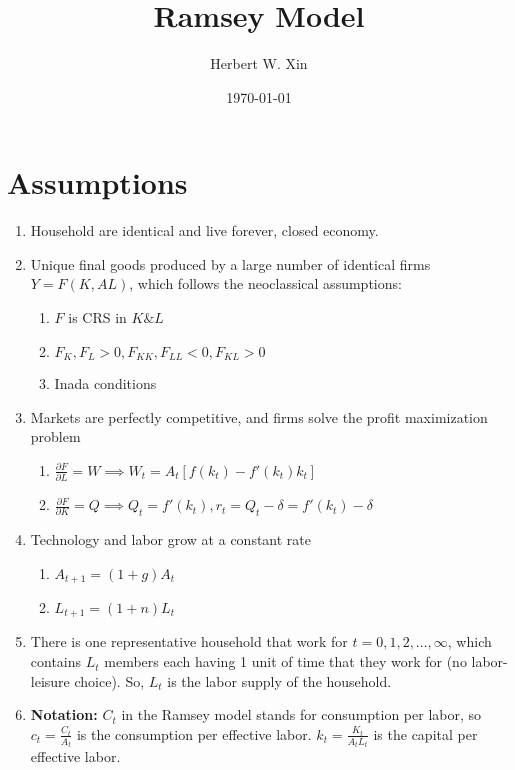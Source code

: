 \documentclass[twocolumn, fleqn]{article}
\begin{document}
	\title{Ramsey Model}
	\author{Herbert W. Xin}
	\date{\today}
	\maketitle

	\tableofcontents
	\thispagestyle{fancy}

	\section{Assumptions}\label{sec:assumptions}
		\begin{enumerate}
			\item Household are identical and live forever, closed economy.
			\item Unique final goods produced by a large number of identical firms $Y = F(K,AL)$, which follows the
			neoclassical assumptions:
				\begin{enumerate}
					\item $F$ is CRS in $K \& L$
					\item $F_K, F_L>0, F_{KK}, F_{LL}<0, F_{KL}>0$
					\item Inada conditions
				\end{enumerate}
			\item Markets are perfectly competitive, and firms solve the profit maximization problem
				\begin{enumerate}
					\item $\frac{\partial F}{\partial L}=W \implies W_t = A_t [f(k_t)-f'(k_t)k_t]$
					\item $\frac{\partial F}{\partial K}=Q \implies Q_t = f'(k_t), r_t = Q_t -\delta=f'(k_t)-\delta$
				\end{enumerate}
			\item Technology and labor grow at a constant rate
			    \begin{enumerate}
					\item $A_{t+1} = (1+g)A_t$
					\item $L_{t+1} = (1+n)L_t$
			    \end{enumerate}
			\item There is one representative household that work for $t = 0,1,2,\ldots,\infty$, which contains $L_t$ members each having 1 unit of time that they work for (no labor-leisure choice). So, $L_t$ is the labor supply of the household.
			\item \textbf{Notation:} $C_t$ in the Ramsey model stands for consumption per labor, so $c_t = \frac{C_t}{A_t}$ is the
			consumption per effective labor. $k_t = \frac{K_t}{A_t L_t}$ is the capital per effective labor.
		\end{enumerate}
\end{document}
